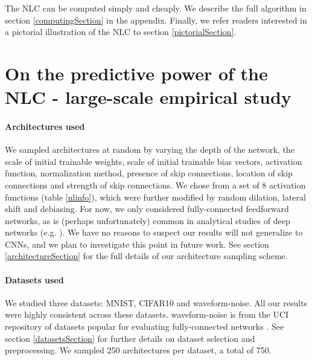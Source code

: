 \documentclass{article} %
\begin{document}
The NLC can be computed simply and cheaply. We describe the full algorithm in section \ref{computingSection} in the appendix. Finally, we refer readers interested in a pictorial illustration of the NLC to section \ref{pictorialSection}.

\section{On the predictive power of the NLC - large-scale empirical study} \label{nlcSection}

\paragraph{Architectures used} We sampled architectures at random by varying the depth of the network, the scale of initial trainable weights, scale of initial trainable bias vectors, activation function, normalization method, presence of skip connections, location of skip connections and strength of skip connections. We chose from a set of 8 activation functions (table \ref{nlinfo}), which were further modified by random dilation, lateral shift and debiasing. For now, we only considered fully-connected feedforward networks, as is (perhaps unfortunately) common in analytical studies of deep networks (e.g. \citet{orthogonalInitialization,gradientCorrelation,
depthScalesMeanField}). We have no reasons to suspect our results will not generalize to CNNs, and we plan to investigate this point in future work. See section \ref{architectureSection} for the full details of our architecture sampling scheme.


\paragraph{Datasets used} We studied three datasets: MNIST, CIFAR10 and waveform-noise. All our results were highly consistent across these datasets. waveform-noise is from the UCI repository of datasets popular for evaluating fully-connected networks \citep{selu}. See section \ref{datasetsSection} for further details on dataset selection and preprocessing. We sampled 250 architectures per dataset, a total of 750.
\end{document}
